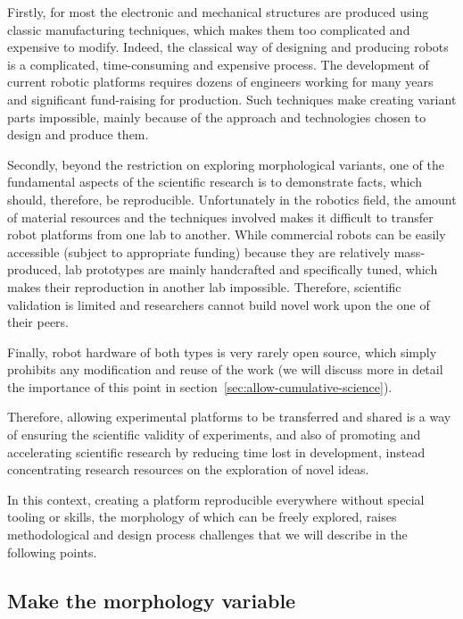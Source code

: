 Firstly, for most the electronic and mechanical structures are produced using classic manufacturing techniques,  which makes them too complicated and expensive to modify. Indeed, the classical way of designing and producing robots is a complicated, time-consuming and expensive process. The development of current robotic platforms requires dozens of engineers working for many years and significant fund-raising for production. Such techniques make creating variant parts impossible, mainly because of the approach and technologies chosen to design and produce them.


Secondly, beyond the restriction on exploring morphological variants, one of the fundamental aspects of the scientific research is to demonstrate facts, which should, therefore, be reproducible. Unfortunately in the robotics field, the amount of material resources and the techniques involved makes it difficult to transfer robot platforms from one lab to another. While commercial robots can be easily accessible (subject to appropriate funding) because they are relatively mass-produced, lab prototypes are mainly handcrafted and specifically tuned, which makes their  reproduction in another lab impossible. Therefore, scientific validation is limited and researchers cannot build novel work upon the one of their peers.

Finally, robot hardware of both types is very rarely open source, which simply prohibits any modification and reuse of the work (we will discuss more in detail the importance of this point in section~\ref{sec:allow-cumulative-science}).

Therefore, allowing  experimental platforms to be transferred and shared is a way of ensuring the scientific validity of experiments, and also of promoting and accelerating scientific research by reducing time lost in development, instead concentrating research resources on the exploration of novel ideas.


In this context, creating a platform reproducible everywhere without special tooling or skills, the morphology of which can be freely explored, raises methodological and design process challenges that we will describe in the following points.

\subsection{Make the morphology variable} %

